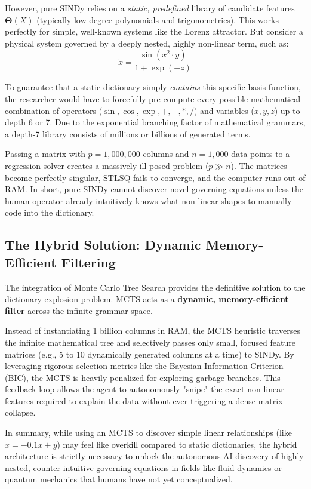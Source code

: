 \documentclass[11pt,a4paper]{article}
\begin{document}
However, pure SINDy relies on a \textit{static, predefined} library of candidate features $\mathbf{\Theta}(X)$ (typically low-degree polynomials and trigonometrics). This works perfectly for simple, well-known systems like the Lorenz attractor. But consider a physical system governed by a deeply nested, highly non-linear term, such as:
\begin{equation}
    \dot{x} = \frac{\sin(x^2 \cdot y)}{1 + \exp(-z)}
\end{equation}

To guarantee that a static dictionary simply \textit{contains} this specific basis function, the researcher would have to forcefully pre-compute every possible mathematical combination of operators ($\sin, \cos, \exp, +, -, *, /$) and variables ($x, y, z$) up to depth 6 or 7. Due to the exponential branching factor of mathematical grammars, a depth-7 library consists of millions or billions of generated terms.

Passing a matrix with $p = 1,000,000$ columns and $n = 1,000$ data points to a regression solver creates a massively ill-posed problem ($p \gg n$). The matrices become perfectly singular, STLSQ fails to converge, and the computer runs out of RAM. In short, pure SINDy cannot discover novel governing equations unless the human operator already intuitively knows what non-linear shapes to manually code into the dictionary.

\subsection{The Hybrid Solution: Dynamic Memory-Efficient Filtering}
The integration of Monte Carlo Tree Search provides the definitive solution to the dictionary explosion problem. MCTS acts as a \textbf{dynamic, memory-efficient filter} across the infinite grammar space.

Instead of instantiating 1 billion columns in RAM, the MCTS heuristic traverses the infinite mathematical tree and selectively passes only small, focused feature matrices (e.g., 5 to 10 dynamically generated columns at a time) to SINDy. By leveraging rigorous selection metrics like the Bayesian Information Criterion (BIC), the MCTS is heavily penalized for exploring garbage branches. This feedback loop allows the agent to autonomously "snipe" the exact non-linear features required to explain the data without ever triggering a dense matrix collapse.

In summary, while using an MCTS to discover simple linear relationships (like $\dot{x} = -0.1x + y$) may feel like overkill compared to static dictionaries, the hybrid architecture is strictly necessary to unlock the autonomous AI discovery of highly nested, counter-intuitive governing equations in fields like fluid dynamics or quantum mechanics that humans have not yet conceptualized.
\end{document}
